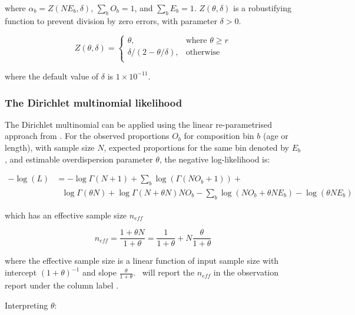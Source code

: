 where $\alpha_b = Z \left(N E_b,\delta \right)$, $\sum\limits_b O_b = 1$, and $\sum\limits_b E_b = 1$. $Z \left(\theta,\delta \right)$ is a robustifying function to prevent division by zero errors, with parameter $\delta>0$.

\begin{equation}
	Z \left(\theta,\delta \right) = \begin{cases}
	\theta, & \text{where $\theta \ge r$} \\
	\delta/\left( 2-\theta/\delta \right), & \text{otherwise} \\
	\end{cases}
\end{equation}

where the default value of $\delta$ is $1 \times 10^{-11}$.

\subsubsection{The Dirichlet multinomial likelihood }

The Dirichlet multinomial can be applied using the linear re-parametrised approach from \citep{thorson2017model}. For the observed proportions $O_b$ for composition bin $b$ (age or length), with sample size $N$, expected proportions for the same bin denoted by $E_b$, and estimable overdispersion parameter \(\theta\), the negative log-likelihood is:

\begin{align*}
	-\log \left(L \right) &=  -\log \Gamma \left(N + 1 \right) + \sum\limits_b \log \left( \Gamma \left(NO_b + 1\right) \right) + \\
 	& \ \ \ \log \Gamma \left(\theta N\right) + \log \Gamma \left(N + \theta N\right)  NO_b - \sum\limits_b \log (NO_b + \theta N E_b) - \log(\theta N E_b)
\end{align*}

which has an effective sample size \(n_{eff}\)

\[
n_{eff} = \frac{1 + \theta N}{1 + \theta} = \frac{1}{1 + \theta} + N\frac{\theta}{1 + \theta}
\]

where the effective sample size is a linear function of input sample size with intercept \((1 + \theta)^{-1}\)  and slope \(\frac{\theta}{1 + \theta}\). \CNAME\ will report the \(n_{eff}\) in the observation report under the column label .

Interpreting \(\theta\):

